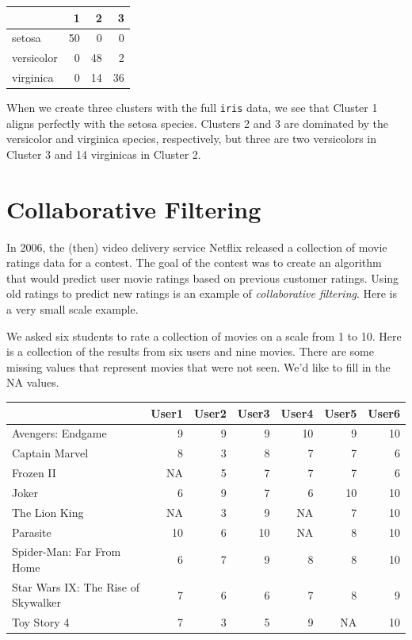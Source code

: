 \documentclass[
]{book}
\theoremstyle{definition}
\theoremstyle{definition}
\theoremstyle{definition}
\theoremstyle{definition}
\theoremstyle{remark}
\begin{document}
\begin{longtable}{lrrr}
\toprule
  & 1 & 2 & 3\\
\midrule
setosa & 50 & 0 & 0\\
versicolor & 0 & 48 & 2\\
virginica & 0 & 14 & 36\\
\bottomrule
\end{longtable}

When we create three clusters with the full \texttt{iris} data, we see that Cluster 1 aligns perfectly with the setosa species. Clusters 2 and 3 are dominated by the versicolor and virginica species, respectively, but three are two versicolors in Cluster 3 and 14 virginicas in Cluster 2.

\section{Collaborative Filtering}\label{collaborative-filtering}

In 2006, the (then) video delivery service Netflix released a collection of movie ratings data for a contest\autocite{Netflix}. The goal of the contest was to create an algorithm that would predict user movie ratings based on previous customer ratings. Using old ratings to predict new ratings is an example of \emph{collaborative filtering}. Here is a very small scale example.

We asked six students to rate a collection of movies on a scale from 1 to 10. Here is a collection of the results from six users and nine movies. There are some missing values that represent movies that were not seen. We'd like to fill in the NA values.

\small

\begin{longtable}{lrrrrrr}
\toprule
  & User1 & User2 & User3 & User4 & User5 & User6\\
\midrule
Avengers: Endgame & 9 & 9 & 9 & 10 & 9 & 10\\
Captain Marvel & 8 & 3 & 8 & 7 & 7 & 6\\
Frozen II & NA & 5 & 7 & 7 & 7 & 6\\
Joker & 6 & 9 & 7 & 6 & 10 & 10\\
The Lion King & NA & 3 & 9 & NA & 7 & 10\\
Parasite & 10 & 6 & 10 & NA & 8 & 10\\
Spider-Man: Far From Home & 6 & 7 & 9 & 8 & 8 & 10\\
Star Wars IX: The Rise of Skywalker & 7 & 6 & 6 & 7 & 8 & 9\\
Toy Story 4 & 7 & 3 & 5 & 9 & NA & 10\\
\bottomrule
\end{longtable}
\end{document}
